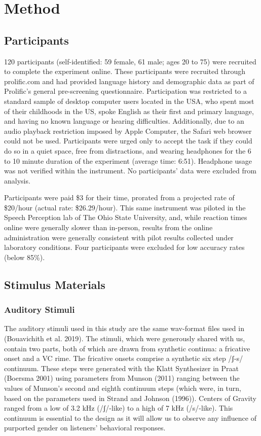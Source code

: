 \documentclass[
  letterpaper,
  DIV=11,
  numbers=noendperiod]{scrartcl}
\begin{document}
\section{Method}\label{sec-method}

\subsection{Participants}\label{sec-participants}

120 participants (self-identified: 59 female, 61 male; ages 20 to 75)
were recruited to complete the experiment online. These participants
were recruited through prolific.com and had provided language history
and demographic data as part of Prolific's general pre-screening
questionnaire. Participation was restricted to a standard sample of
desktop computer users located in the USA, who spent most of their
childhoods in the US, spoke English as their first and primary language,
and having no known language or hearing difficulties. Additionally, due
to an audio playback restriction imposed by Apple Computer, the Safari
web browser could not be used. Participants were urged only to accept
the task if they could do so in a quiet space, free from distractions,
and wearing headphones for the 6 to 10 minute duration of the experiment
(average time: 6:51). Headphone usage was not verified within the
instrument. No participants' data were excluded from analysis.

Participants were paid \$3 for their time, prorated from a projected
rate of \$20/hour (actual rate: \$26.29/hour). This same instrument was
piloted in the Speech Perception lab of The Ohio State University, and,
while reaction times online were generally slower than in-person,
results from the online administration were generally consistent with
pilot results collected under laboratory conditions. Four participants
were excluded for low accuracy rates (below 85\%).

\subsection{Stimulus Materials}\label{sec-stimuli}

\subsubsection{Auditory Stimuli}\label{sec-stimuli-auditory}

The auditory stimuli used in this study are the same wav-format files
used in (Bouavichith et al. 2019). The stimuli, which were generously
shared with us, contain two parts, both of which are drawn from
synthetic continua: a fricative onset and a VC rime. The fricative
onsets comprise a synthetic six step /ʃ-s/ continuum. These steps were
generated with the Klatt Synthesizer in Praat (Boersma 2001) using
parameters from Munson (2011) ranging between the values of Munson's
second and eighth continuum steps (which were, in turn, based on the
parameters used in Strand and Johnson (1996)). Centers of Gravity ranged
from a low of 3.2 kHz (/ʃ/-like) to a high of 7 kHz (/s/-like). This
continuum is essential to the design as it will allow us to observe any
influence of purported gender on listeners' behavioral responses.
\end{document}
